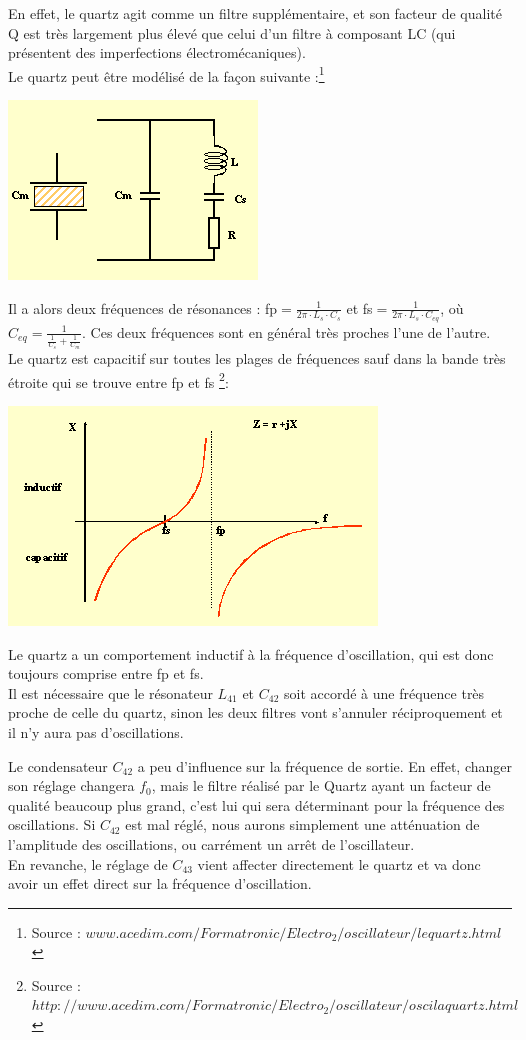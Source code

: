 \documentclass{article}
\begin{document}
En effet, le quartz agit comme un filtre supplémentaire, et son facteur de qualité Q est très largement plus élevé que celui d'un filtre à composant LC (qui présentent des imperfections électromécaniques).\\

Le quartz peut être modélisé de la façon suivante :\footnote{Source : $www.acedim.com/Formatronic/Electro_2/oscillateur/lequartz.html$}
\begin{center}
\includegraphics[width=0.4\linewidth]{modele_quartz.png}
\end{center}
Il a alors deux fréquences de résonances : fp$=\frac{1}{2\pi \cdot L_s \cdot C_s}$ et fs$=\frac{1}{2\pi \cdot L_s \cdot C_{eq}}$, où $C_{eq} = \frac{1}{\frac{1}{C_s} + \frac{1}{C_m}}$. Ces deux fréquences sont en général très proches l'une de l'autre.\\
Le quartz est capacitif sur toutes les plages de fréquences sauf dans la bande très étroite qui se trouve entre fp et fs \footnote{Source : $http://www.acedim.com/Formatronic/Electro_2/oscillateur/oscilaquartz.html$}:
\begin{center}
\includegraphics[width=0.4\linewidth]{impedence_quartz.png}
\end{center}

Le quartz a un comportement inductif à la fréquence d'oscillation, qui est donc toujours comprise entre fp et fs.\\

Il est nécessaire que le résonateur $L_{41}$ et $C_{42}$ soit accordé à une fréquence très proche de celle du quartz, sinon les deux filtres vont s'annuler réciproquement et il n'y aura pas d'oscillations.


Le condensateur $C_{42}$ a peu d'influence sur la fréquence de sortie. En effet, changer son réglage changera $f_0$, mais le filtre réalisé par le Quartz ayant un facteur de qualité beaucoup plus grand, c'est lui qui sera déterminant pour la fréquence des oscillations. Si $C_{42}$ est mal réglé, nous aurons simplement une atténuation de l'amplitude des oscillations, ou carrément un arrêt de l'oscillateur.\\
En revanche, le réglage de $C_{43}$ vient affecter directement le quartz et va donc avoir un effet direct sur la fréquence d'oscillation.
\end{document}
